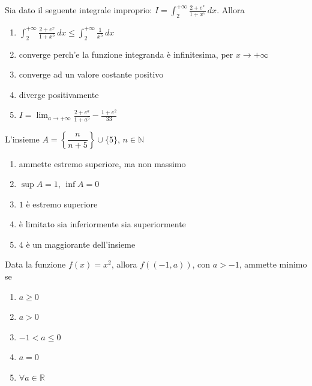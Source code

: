 \begin{quiz}
Sia dato il seguente integrale improprio: $\displaystyle I=\int_2^{+\infty}\frac{2+e^x}{1+x^5}\,dx$. Allora
\begin{enumerate}
\item $\displaystyle\int_2^{+\infty}\frac{2+e^x}{1+x^5}\,dx\le\int_2^{+\infty}\frac1{x^5}\,dx$
\item converge perch'e la funzione integranda \`e infinitesima, per $x\to+\infty$
\item converge ad un valore costante positivo
\item diverge positivamente
\item $\displaystyle I=\lim_{a\to+\infty}\frac{2+e^a}{1+a^5}-\frac{1+e^2}{33}$
\end{enumerate}
\end{quiz}

\begin{quiz}
L'insieme $A=\left\{\dfrac{n}{n+5}\right\}\cup\{5\}$, $n\in\mathbb N$
\begin{enumerate}
\item ammette estremo superiore, ma non massimo
\item $\sup A=1$, $\inf A=0$
\item $1$ \`e estremo superiore
\item \`e limitato sia inferiormente sia superiormente
\item $4$ \`e un maggiorante dell'insieme
\end{enumerate}
\end{quiz}

\begin{quiz}
Data la funzione $f(x)=x^2$, allora $f((-1,a))$, con $a>-1$, ammette minimo se
\begin{enumerate}
\item $a\ge0$
\item $a>0$
\item $-1<a\le0$
\item $a=0$
\item $\forall a\in\mathbb R$
\end{enumerate}
\end{quiz}

